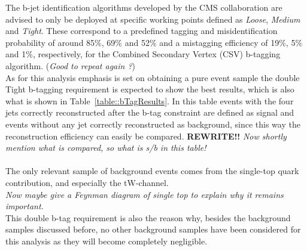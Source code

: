 The b-jet identification algorithms developed by the CMS collaboration are advised to only be deployed at specific working points defined as \textit{Loose}, \textit{Medium} and \textit{Tight}.
These correspond to a predefined tagging and misidentification probability of around 85$\%$, 69$\%$ and 52$\%$ and a mistagging efficiency of 19$\%$, 5$\%$ and 1$\%$, respectively, for the Combined Secondary Vertex (CSV) b-tagging algorithm. (\textit{Good to repeat again ?})\\
As for this analysis emphasis is set on obtaining a pure event sample the double Tight b-tagging requirement is expected to show the best results, which is also what is shown in Table~\ref{table::bTagResults}. In this table events with the four jets correctly reconstructed after the b-tag constraint are defined as signal and events without any jet correctly reconstructed as background, since this way the reconstruction efficiency can easily be compared. \textbf{REWRITE!!} 
\textit{Now shortly mention what is compared, so what is s/b in this table!}\\
\\

The only relevant sample of background events comes from the single-top quark contribution, and especially the tW-channel. \\
\textit{Now maybe give a Feynman diagram of single top to explain why it remains important.}\\
This double b-tag requirement is also the reason why, besides the background samples discussed before, no other background samples have been considered for this analysis as they will become completely negligible.
\\

